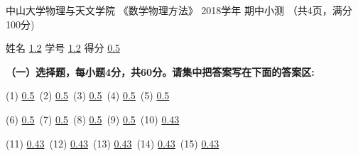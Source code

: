 \documentclass[CJK]{article}
\begin{document}
\bch
\bcenter
中山大学物理与天文学院 《数学物理方法》 2018学年 期中小测 （共4页，满分100分) 

{\vskip 0.04in}

姓名 \uline{1.2} {\hskip 0.5in}    学号 \uline{1.2}{\hskip 0.5in} 得分 \uline{0.5}

\ecenter

{\vskip 0.02in}
    
{\bf \noindent（一）选择题，每小题4分，共60分。请集中把答案写在下面的答案区:}

{\vskip 0.04in}

{(1) \uline{0.5}\  (2) \uline{0.5}\ (3) \uline{0.5}\  (4) \uline{0.5}\ (5) \uline{0.5}}

{\vskip 0.04in}

{(6) \uline{0.5}\ (7) \uline{0.5}\ (8) \uline{0.5}\  (9) \uline{0.5}\ (10) \uline{0.43}}

{\vskip 0.04in}

{(11) \uline{0.43}\  (12) \uline{0.43}\ (13) \uline{0.43}\ (14) \uline{0.43}\ (15) \uline{0.43}}
\end{document}
